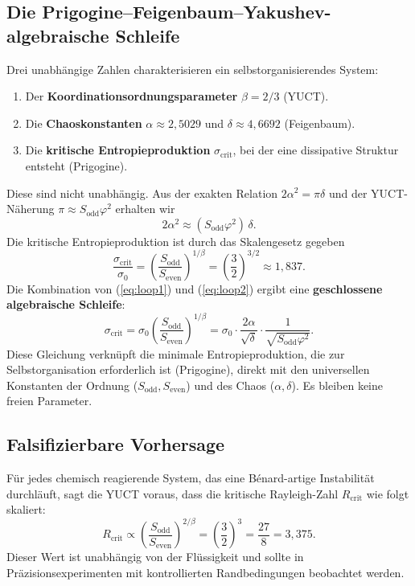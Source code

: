 \documentclass[12pt,a4paper]{article}
\begin{document}
	\subsection{Die Prigogine--Feigenbaum--Yakushev-algebraische Schleife}
	
	Drei unabhängige Zahlen charakterisieren ein selbstorganisierendes System:
	\begin{enumerate}
		\item Der \textbf{Koordinationsordnungsparameter} \(\beta = 2/3\) (YUCT).
		\item Die \textbf{Chaoskonstanten} \(\alpha \approx 2{,}5029\) und \(\delta \approx 4{,}6692\) (Feigenbaum).
		\item Die \textbf{kritische Entropieproduktion} \(\sigma_{\mathrm{crit}}\), bei der eine dissipative Struktur entsteht (Prigogine).
	\end{enumerate}
	Diese sind nicht unabhängig. Aus der exakten Relation \(2\alpha^2 = \pi\delta\) und der YUCT-Näherung \(\pi \approx S_{\mathrm{odd}}\varphi^2\) erhalten wir
	\begin{equation}
		2\alpha^2 \approx (S_{\mathrm{odd}}\varphi^2)\,\delta .
		\label{eq:loop1}
	\end{equation}
	Die kritische Entropieproduktion ist durch das Skalengesetz gegeben
	\begin{equation}
		\frac{\sigma_{\mathrm{crit}}}{\sigma_0} = \left( \frac{S_{\mathrm{odd}}}{S_{\mathrm{even}}} \right)^{1/\beta}
		= \left( \frac{3}{2} \right)^{3/2} \approx 1{,}837 .
		\label{eq:loop2}
	\end{equation}
	Die Kombination von (\ref{eq:loop1}) und (\ref{eq:loop2}) ergibt eine \textbf{geschlossene algebraische Schleife}:
	\[
	\boxed{
		\sigma_{\mathrm{crit}} = \sigma_0 \left( \frac{S_{\mathrm{odd}}}{S_{\mathrm{even}}} \right)^{1/\beta}
		= \sigma_0 \cdot \frac{2\alpha}{\sqrt{\delta}} \cdot \frac{1}{\sqrt{S_{\mathrm{odd}}\varphi^2}} .
	}
	\]
	Diese Gleichung verknüpft die minimale Entropieproduktion, die zur Selbstorganisation erforderlich ist (Prigogine), direkt mit den universellen Konstanten der Ordnung (\(S_{\mathrm{odd}},S_{\mathrm{even}}\)) und des Chaos (\(\alpha,\delta\)). Es bleiben keine freien Parameter.
	
	\subsection{Falsifizierbare Vorhersage}
	
	Für jedes chemisch reagierende System, das eine Bénard-artige Instabilität durchläuft, sagt die YUCT voraus, dass die kritische Rayleigh-Zahl \(R_{\mathrm{crit}}\) wie folgt skaliert:
	\[
	R_{\mathrm{crit}} \propto \left( \frac{S_{\mathrm{odd}}}{S_{\mathrm{even}}} \right)^{2/\beta}
	= \left( \frac{3}{2} \right)^3 = \frac{27}{8} = 3{,}375 .
	\]
	Dieser Wert ist unabhängig von der Flüssigkeit und sollte in Präzisionsexperimenten mit kontrollierten Randbedingungen beobachtet werden.
	
\end{document}
